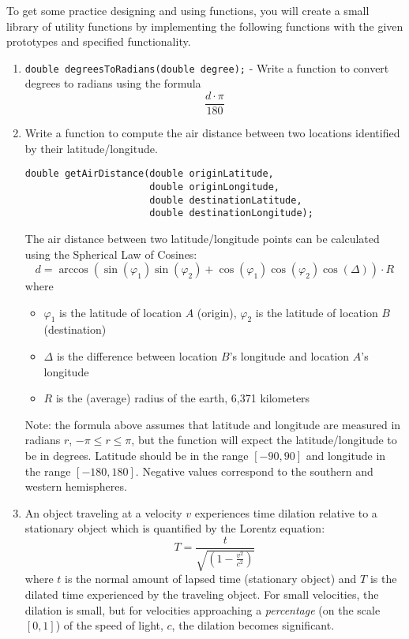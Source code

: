 \documentclass[12pt]{scrartcl}
\begin{document}
To get some practice designing and using functions, you will 
create a small library of utility functions by implementing
the following functions with the given prototypes and specified 
functionality.
\begin{enumerate}
  \item \texttt{double degreesToRadians(double degree);} - Write a 
  	function to convert degrees to radians using the formula 
		$$\frac{d\cdot \pi}{180}$$
  \item Write a function to compute the air distance between two locations 
    identified by their latitude/longitude.  
\begin{verbatim}
double getAirDistance(double originLatitude, 
                      double originLongitude, 
                      double destinationLatitude, 
                      double destinationLongitude);
\end{verbatim}  
The air distance between two latitude/longitude points can be calculated 
using the Spherical Law of Cosines:
 $$d = \arccos{(\sin(\varphi_1) \sin(\varphi_2) + \cos(\varphi_1) \cos(\varphi_2) \cos(\Delta) )} \cdot R$$
where
\begin{itemize}
  \item $\varphi_1$ is the latitude of location $A$ (origin), $\varphi_2$ is the latitude of location $B$ (destination)
  \item $\Delta$ is the difference between location $B$'s longitude and location $A$'s longitude
  \item $R$ is the (average) radius of the earth, 6,371 kilometers
\end{itemize}
Note: the formula above assumes that latitude and longitude are measured 
in radians $r$, $-\pi \leq r \leq \pi$, but the function will expect 
the latitude/longitude to be in degrees.  Latitude should be in the range 
$[-90, 90]$ and longitude in the range $[-180, 180]$.  Negative values 
correspond to the southern and western hemispheres.

  \item An object traveling at a velocity $v$ experiences time dilation
  relative to a stationary object which is quantified by the Lorentz equation:
  $$T = \frac{t}{\sqrt{(1-\frac{v^2}{c^2})}}$$
  where $t$ is the normal amount of lapsed time (stationary object) 
  and $T$ is the dilated time experienced by the traveling object.  
  For small velocities, the dilation is small, but for velocities
  approaching a \emph{percentage} (on the scale $[0, 1]$) of the 
  speed of light, $c$, the dilation becomes significant.
  

\end{enumerate}
\end{document}
